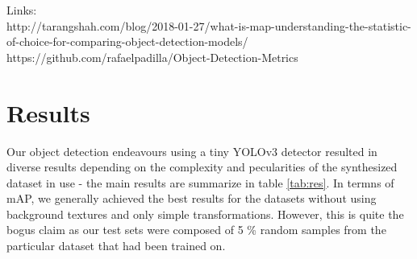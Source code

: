 \documentclass[a4paper]{article}
\begin{document}
Links: \\
http://tarangshah.com/blog/2018-01-27/what-is-map-understanding-the-statistic-of-choice-for-comparing-object-detection-models/
\\
https://github.com/rafaelpadilla/Object-Detection-Metrics\\
\section{Results}
Our object detection endeavours using a tiny YOLOv3 detector resulted in diverse results depending on the complexity and pecularities of the synthesized dataset in use - the main results are summarize in table \ref{tab:res}. In termns of mAP, we generally achieved the best results for the datasets without using background textures and only simple transformations. However, this is quite the bogus claim as our test sets were composed of 5 \% random samples from the particular dataset that had been trained on.
\end{document}
